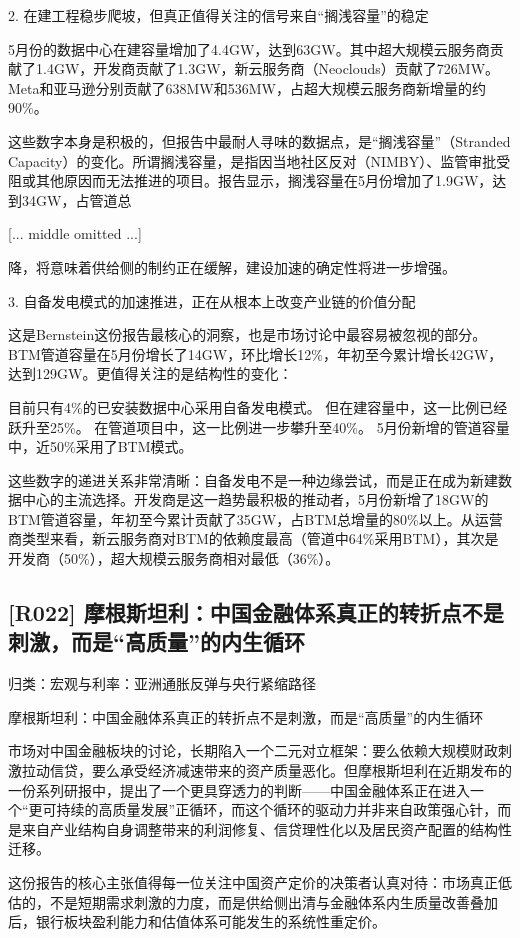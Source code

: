 \documentclass[11pt]{ctexart}
\begin{document}
2. 在建工程稳步爬坡，但真正值得关注的信号来自“搁浅容量”的稳定

5月份的数据中心在建容量增加了4.4GW，达到63GW。其中超大规模云服务商贡献了1.4GW，开发商贡献了1.3GW，新云服务商（Neoclouds）贡献了726MW。Meta和亚马逊分别贡献了638MW和536MW，占超大规模云服务商新增量的约90\%。

这些数字本身是积极的，但报告中最耐人寻味的数据点，是“搁浅容量”（Stranded Capacity）的变化。所谓搁浅容量，是指因当地社区反对（NIMBY）、监管审批受阻或其他原因而无法推进的项目。报告显示，搁浅容量在5月份增加了1.9GW，达到34GW，占管道总

[... middle omitted ...]

降，将意味着供给侧的制约正在缓解，建设加速的确定性将进一步增强。

3. 自备发电模式的加速推进，正在从根本上改变产业链的价值分配

这是Bernstein这份报告最核心的洞察，也是市场讨论中最容易被忽视的部分。BTM管道容量在5月份增长了14GW，环比增长12\%，年初至今累计增长42GW，达到129GW。更值得关注的是结构性的变化：

目前只有4\%的已安装数据中心采用自备发电模式。 但在建容量中，这一比例已经跃升至25\%。 在管道项目中，这一比例进一步攀升至40\%。 5月份新增的管道容量中，近50\%采用了BTM模式。

这些数字的递进关系非常清晰：自备发电不是一种边缘尝试，而是正在成为新建数据中心的主流选择。开发商是这一趋势最积极的推动者，5月份新增了18GW的BTM管道容量，年初至今累计贡献了35GW，占BTM总增量的80\%以上。从运营商类型来看，新云服务商对BTM的依赖度最高（管道中64\%采用BTM），其次是开发商（50\%），超大规模云服务商相对最低（36\%）。

\subsection{[R022] 摩根斯坦利：中国金融体系真正的转折点不是刺激，而是“高质量”的内生循环}
{\small\color{refgray}归类：宏观与利率：亚洲通胀反弹与央行紧缩路径}

摩根斯坦利：中国金融体系真正的转折点不是刺激，而是“高质量”的内生循环

市场对中国金融板块的讨论，长期陷入一个二元对立框架：要么依赖大规模财政刺激拉动信贷，要么承受经济减速带来的资产质量恶化。但摩根斯坦利在近期发布的一份系列研报中，提出了一个更具穿透力的判断——中国金融体系正在进入一个“更可持续的高质量发展”正循环，而这个循环的驱动力并非来自政策强心针，而是来自产业结构自身调整带来的利润修复、信贷理性化以及居民资产配置的结构性迁移。

这份报告的核心主张值得每一位关注中国资产定价的决策者认真对待：市场真正低估的，不是短期需求刺激的力度，而是供给侧出清与金融体系内生质量改善叠加后，银行板块盈利能力和估值体系可能发生的系统性重定价。
\end{document}
